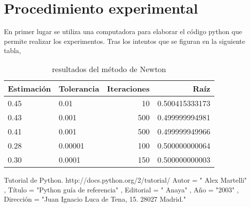 \documentclass[a4paper,10pt]{article}
\begin{document}
\section{Procedimiento experimental}
En primer lugar se utiliza una computadora para elaborar el código python que permite realizar los experimentos. Tras los intentos que se figuran en la siguiente tabla, 
\begin{table}[!ht]
\begin{center}
\begin{tabular}{|l|l|r|r|}
Estimación & Tolerancia & Iteraciones & Raíz \\
\hline
0.45 & 0.01 & 10 & 0.500415333173 \\
0.43 & 0.001 & 500 & 0.499999994981 \\
0.41 & 0.001 & 500 & 0.499999949966 \\
0.28 & 0.00001 & 100 & 0.500000000064\\
0.30 & 0.0001 & 150 & 0.500000000003
\end{tabular}
\end{center}
\caption{resultados del método de Newton}
\label{history}
\end{table}
\newpage
\begin{thebibliography}{2}
 Tutorial de Python. http://docs.python.org/2/tutorial/ 
     Autor =    " Alex Martelli" ,
     Título =     "Python guía de referencia" ,
     Editorial = " Anaya" ,
     Año =      "2003" ,
     Dirección =   "Juan Ignacio Luca de Tena, 15. 28027 Madrid." 

\end{thebibliography}
\end{document}

